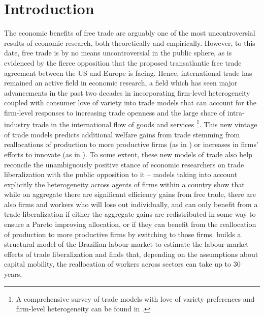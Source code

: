 \section{Introduction}
The economic benefits of free trade are arguably one of the most uncontroversial results of economic research, both theoretically and empirically. However, to this date, free trade is by no means uncontroversial in the public sphere, as is evidenced by the fierce opposition that the proposed transatlantic free trade agreement between the US and Europe is facing. Hence, international trade has remained an active field in economic research, a field which has seen major advancements in the past two decades in incorporating firm-level heterogeneity coupled with consumer love of variety into trade models that can account for the firm-level responses to increasing trade openness and the large share of intra-industry trade in the international flow of goods and services \footnote{A comprehensive survey of trade models with love of variety preferences and firm-level heterogeneity can be found in \citet*{MelitzTrefler2012}.}. This new vintage of trade models predicts additional welfare gains from trade stemming from reallocations of production to more productive firms (as in \citealp{Melitz2003}) or increases in firms' efforts to innovate (as in \citealp{GrossmanHelpman1990}). To some extent, these new models of trade also help reconcile the unambiguously positive stance of economic researchers on trade liberalization with the public opposition to it -- models taking into account explicitly the heterogeneity across agents of firms within a country show that while on aggregate there are significant efficiency gains from free trade, there are also firms and workers who will lose out individually, and can only benefit from a trade liberalization if either the aggregate gains are redistributed in some way to ensure a Pareto improving allocation, or if they can benefit from the reallocation of production to more productive firms by switching to those firms. \citet{DixCarneiro2014} builds a structural model of the Brazilian labour market to estimate the labour market effects of trade liberalization and finds that, depending on the assumptions about capital mobility, the reallocation of workers across sectors can take up to 30 years. \\
